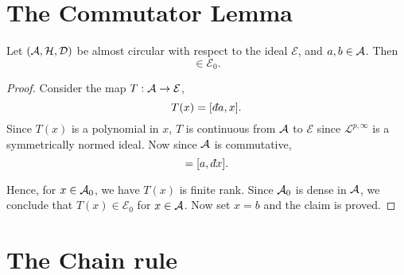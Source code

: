 \section{The Commutator Lemma}
\begin{lemma}
\label{commutator}
    Let $(\mathcal{A},\mathcal{H},\mathcal{D})$ be almost circular with respect to the ideal $\mathcal{E}$, and $a,b \in \mathcal{A}$. Then
    \begin{equation*}
        [\qd a,b] \in \mathcal{E}_0.
    \end{equation*}
\end{lemma}
\begin{proof}
    Consider the map $T:\mathcal{A}\to\mathcal{E}$,
    \begin{equation*}
        T(x) = [\qd a,x].
    \end{equation*}
    Since $T(x)$
    is a polynomial in $x$, $T$ is continuous from $\mathcal{A}$ to $\mathcal{E}$
    since $\mathcal{L}^{p,\infty}$ is a symmetrically normed ideal. Now since
    $\mathcal{A}$ is commutative,
    \begin{equation*}
        [\qd a,x] = [a,\qd x].
    \end{equation*}
    
    Hence, for $x \in \mathcal{A}_0$, we have $T(x)$ is finite rank. Since $\mathcal{A}_0$
    is dense in $\mathcal{A}$, we conclude that $T(x) \in \mathcal{E}_0$
    for $x \in \mathcal{A}$. Now set $x = b$ and the claim is proved.
\end{proof}

\section{The Chain rule}


